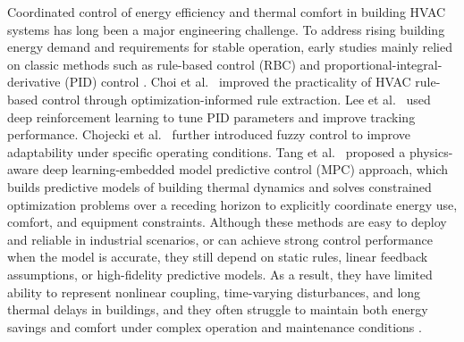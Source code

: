 ﻿\documentclass[preprint,12pt,number]{elsarticle}
\begin{document}
Coordinated control of energy efficiency and thermal comfort in building HVAC systems has long been a major engineering challenge. To address rising building energy demand and requirements for stable operation, early studies mainly relied on classic methods such as rule-based control (RBC) and proportional-integral-derivative (PID) control \cite{ref12}. Choi et al.~\cite{ref13} improved the practicality of HVAC rule-based control through optimization-informed rule extraction. Lee et al.~\cite{ref14} used deep reinforcement learning to tune PID parameters and improve tracking performance. Chojecki et al.~\cite{ref15} further introduced fuzzy control to improve adaptability under specific operating conditions. Tang et al.~\cite{ref16} proposed a physics-aware deep learning-embedded model predictive control (MPC) approach, which builds predictive models of building thermal dynamics and solves constrained optimization problems over a receding horizon to explicitly coordinate energy use, comfort, and equipment constraints. Although these methods are easy to deploy and reliable in industrial scenarios, or can achieve strong control performance when the model is accurate, they still depend on static rules, linear feedback assumptions, or high-fidelity predictive models. As a result, they have limited ability to represent nonlinear coupling, time-varying disturbances, and long thermal delays in buildings, and they often struggle to maintain both energy savings and comfort under complex operation and maintenance conditions \cite{ref17}.
\end{document}
